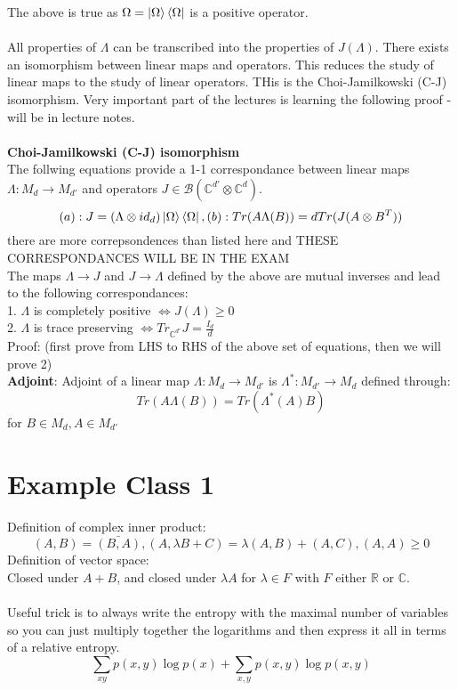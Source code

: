 \documentclass{article}
\begin{document}
The above is true as $\Omega = \ket{\Omega}\bra{\Omega}$ is a positive operator.\\\\
All properties of $\Lambda$ can be transcribed into the properties of $J(\Lambda)$. There exists an isomorphism between linear maps and operators. This reduces the study of linear maps to the study of linear operators. THis is the Choi-Jamilkowski (C-J) isomorphism. Very important part of the lectures is learning the following proof - will be in lecture notes.\\\\
\textbf{Choi-Jamilkowski (C-J) isomorphism}\\
The follwing equations provide a 1-1 correspondance between linear maps $\Lambda: M_d \rightarrow M_{d'}$ and operators $J \in \mathcal{B}(\mathbb{C}^{d'} \otimes \mathbb{C}^d)$.
$$
(a): J = (\Lambda \otimes id_d)\ket{\Omega} \bra{\Omega}, (b): Tr(A \Lambda (B)) = d Tr(J(A\otimes B^T)) $$
there are more correpsondences than listed here and THESE CORRESPONDANCES WILL BE IN THE EXAM\\
The maps $\Lambda \rightarrow J $ and $J \rightarrow \Lambda$ defined by the above are mutual inverses and lead to the following correspondances:\\
1. $\Lambda$ is completely positive $\iff J(\Lambda) \geq 0$\\
2. $\Lambda$ is trace preserving $\iff Tr_{\mathbb{C}^{d'}}J = \frac{I_d}{d}$\\
Proof: (first prove from LHS to RHS of the above set of equations, then we will prove 2)\\
\textbf{Adjoint}: Adjoint of a linear map $\Lambda: M_d \rightarrow M_{d'}$ is $\Lambda^*: M_{d'} \rightarrow M_d$ defined through:
$$
Tr (A \Lambda(B)) = Tr (\Lambda^*(A) B)
$$
for $B \in M_d, A \in M_{d'}$
\section{Example Class 1}
Definition of complex inner product:
$$
(A,B) = \bar{(B,A)}, (A, \lambda B + C) = \lambda (A,B) + (A,C), (A,A) \geq 0
$$
Definition of vector space:\\
Closed under $A+B$, and closed under $\lambda A$ for $\lambda \in F$ with $F$ either $\mathbb{R}$ or $\mathbb{C}$.\\\\
Useful trick is to always write the entropy with the maximal number of variables so you can just multiply together the logarithms and then express it all in terms of a relative entropy.
$$
\sum_{xy} p(x,y) \log p(x) + \sum_{x,y} p(x,y) \log p(x,y)
$$
\end{document}
